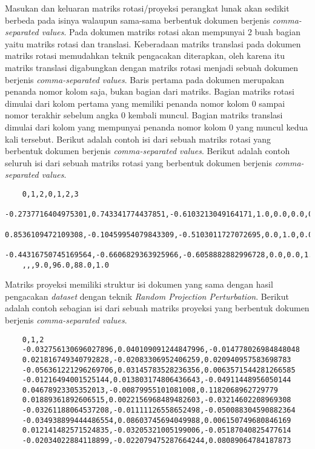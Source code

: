 Masukan dan keluaran matriks rotasi/proyeksi perangkat lunak akan sedikit berbeda pada isinya walaupun sama-sama berbentuk dokumen berjenis \textit{comma-separated values}. Pada dokumen matriks rotasi akan mempunyai 2 buah bagian yaitu matriks rotasi dan translasi. Keberadaan matriks translasi pada dokumen matriks rotasi memudahkan teknik pengacakan diterapkan, oleh karena itu matriks translasi digabungkan dengan matriks rotasi menjadi sebuah dokumen berjenis \textit{comma-separated values}. Baris pertama pada dokumen merupakan penanda nomor kolom saja, bukan bagian dari matriks. Bagian matriks rotasi dimulai dari kolom pertama yang memiliki penanda nomor kolom 0 sampai nomor terakhir sebelum angka 0 kembali muncul. Bagian matriks translasi dimulai dari kolom yang mempunyai penanda nomor kolom 0 yang muncul kedua kali tersebut. Berikut adalah contoh isi dari sebuah matriks rotasi yang berbentuk dokumen berjenis \textit{comma-separated values}. Berikut adalah contoh seluruh isi dari sebuah matriks rotasi yang berbentuk dokumen berjenis \textit{comma-separated values}.

\begin{verbatim}
	0,1,2,0,1,2,3
	-0.2737716404975301,0.743341774437851,-0.6103213049164171,1.0,0.0,0.0,0.0
	0.8536109472109308,-0.10459954079843309,-0.5103011727072695,0.0,1.0,0.0,0.0
	-0.44316750745169564,-0.6606829363925966,-0.6058882882996728,0.0,0.0,1.0,0.0
	,,,9.0,96.0,88.0,1.0
\end{verbatim}

Matriks proyeksi memiliki struktur isi dokumen yang sama dengan hasil pengacakan \textit{dataset} dengan teknik \textit{Random Projection Perturbation}. Berikut adalah contoh sebagian isi dari sebuah matriks proyeksi yang berbentuk dokumen berjenis \textit{comma-separated values}.

\begin{verbatim}
	0,1,2
	-0.032756130696027896,0.040109091244847996,-0.014778026984848048
	0.021816749340792828,-0.02083306952406259,0.020940957583698783
	-0.056361221296269706,0.03145783528236356,0.0063571544281266585
	-0.01216494001525144,0.013803174806436643,-0.04911448956050144
	0.04678923305352013,-0.00879955101081008,0.1182068962729779
	0.01889361892606515,0.0022156968489482603,-0.03214602208969308
	-0.03261188064537208,-0.01111126558652498,-0.050088304590882364
	-0.034938899444486554,0.08603745694049988,0.006150749680846169
	0.012141482571524835,-0.03205321005199006,-0.05187040825477614
	-0.02034022884118899,-0.022079475287664244,0.08089064784187873
\end{verbatim}